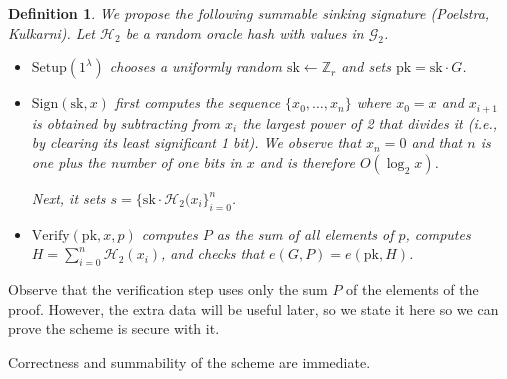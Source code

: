 \documentclass[letterpaper]{article}
\newtheorem{defn}{Definition}
\newcommand{\Setup}{\mathrm{Setup}}
\newcommand{\Sign}{\mathrm{Sign}}
\newcommand{\Verify}{\mathrm{Verify}}
\newcommand{\sk}{\mathrm{sk}}
\newcommand{\pk}{\mathrm{pk}}
\newcommand{\hash}{\mathcal{H}_2}
\begin{document}
\begin{defn}\label{defn:pkss}
We propose the following summable sinking signature (Poelstra, Kulkarni).
Let $\hash$ be a random oracle hash with values in $\mathcal{G}_2$.
\begin{itemize}
\item $\Setup(1^\lambda)$ chooses a uniformly random $\sk\gets\mathbb{Z}_r$
and sets $\pk = \sk\cdot G$.
\item $\Sign(\sk, x)$ first computes the sequence $\{x_0,\ldots,x_n\}$
where $x_0 = x$ and $x_{i+1}$ is obtained by subtracting from $x_i$ the
largest power of 2 that divides it (\emph{i.e.}, by clearing its least
significant 1 bit). We observe that $x_n = 0$ and that $n$ is one plus
the number of one bits in $x$ and is therefore $O(\log_2x)$.

Next, it sets $s = \{\sk\cdot \hash(x_i\}_{i=0}^n$.
\item $\Verify(\pk, x, p)$ computes $P$ as the sum of all elements of $p$,
computes $H = \sum_{i=0}^n \hash(x_i)$, and checks that $e(G, P) = e(\pk, H)$.
\end{itemize}
\end{defn}
Observe that the verification step uses only the sum $P$ of the elements
of the proof. However, the extra data will be useful later, so we state
it here so we can prove the scheme is secure with it.

Correctness and summability of the scheme are immediate.
\end{document}
